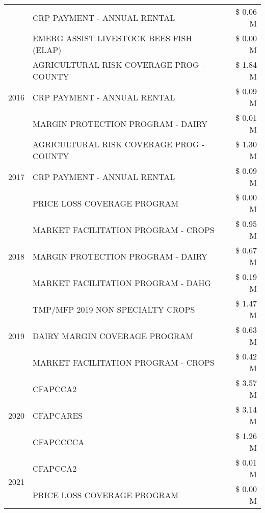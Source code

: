 \begin{tabular}{llr}
 & CRP PAYMENT - ANNUAL RENTAL & \$ 0.06 M \\
 & EMERG ASSIST LIVESTOCK BEES FISH (ELAP) & \$ 0.00 M \\
\cline{1-3}
\multirow[t]{3}{*}{2016} & AGRICULTURAL RISK COVERAGE PROG - COUNTY & \$ 1.84 M \\
 & CRP PAYMENT - ANNUAL RENTAL & \$ 0.09 M \\
 & MARGIN PROTECTION PROGRAM - DAIRY & \$ 0.01 M \\
\cline{1-3}
\multirow[t]{3}{*}{2017} & AGRICULTURAL RISK COVERAGE PROG - COUNTY & \$ 1.30 M \\
 & CRP PAYMENT - ANNUAL RENTAL & \$ 0.09 M \\
 & PRICE LOSS COVERAGE PROGRAM & \$ 0.00 M \\
\cline{1-3}
\multirow[t]{3}{*}{2018} & MARKET FACILITATION PROGRAM - CROPS & \$ 0.95 M \\
 & MARGIN PROTECTION PROGRAM - DAIRY & \$ 0.67 M \\
 & MARKET FACILITATION PROGRAM - DAHG & \$ 0.19 M \\
\cline{1-3}
\multirow[t]{3}{*}{2019} & TMP/MFP 2019 NON SPECIALTY CROPS & \$ 1.47 M \\
 & DAIRY MARGIN COVERAGE PROGRAM & \$ 0.63 M \\
 & MARKET FACILITATION PROGRAM - CROPS & \$ 0.42 M \\
\cline{1-3}
\multirow[t]{3}{*}{2020} & CFAPCCA2 & \$ 3.57 M \\
 & CFAPCARES & \$ 3.14 M \\
 & CFAPCCCCA & \$ 1.26 M \\
\cline{1-3}
\multirow[t]{2}{*}{2021} & CFAPCCA2 & \$ 0.01 M \\
 & PRICE LOSS COVERAGE PROGRAM & \$ 0.00 M \\
\cline{1-3}
\bottomrule
\end{tabular}
